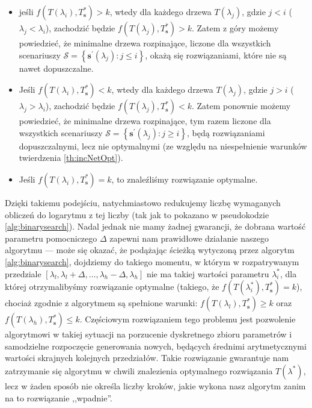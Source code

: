 \begin{itemize}
	\item jeśli $f \left( T \left( \lambda_{i} \right), T^{\ast}_{\textbf{s}} \right) > k$, wtedy dla każdego drzewa $T \left( \lambda_{j} \right)$, gdzie $j < i$ ($\lambda_{j} < \lambda_{i}$), zachodzić będzie $f \left( T \left( \lambda_{j} \right), T^{\ast}_{\textbf{s}} \right) > k$. Zatem z góry możemy powiedzieć, że minimalne drzewa rozpinające, liczone dla wszystkich scenariuszy $\mathcal{S} = \left\{ \textbf{s}^{\prime} \left( \lambda_{j} \right) : j \leqslant i \right\}$, okażą się rozwiązaniami, które nie są nawet dopuszczalne.
	\item Jeśli $f \left( T \left( \lambda_{i} \right), T^{\ast}_{\textbf{s}} \right) < k$, wtedy dla każdego drzewa $T \left( \lambda_{j} \right)$, gdzie $j > i$ ($\lambda_{j} > \lambda_{i}$), zachodzić będzie $f \left( T \left( \lambda_{j} \right), T^{\ast}_{\textbf{s}} \right) < k$. Zatem ponownie możemy powiedzieć, że minimalne drzewa rozpinające, tym razem liczone dla wszystkich scenariuszy $\mathcal{S} = \left\{ \textbf{s}^{\prime} \left( \lambda_{j} \right) : j \geqslant i \right\}$, będą rozwiązaniami dopuszczalnymi, lecz nie optymalnymi (ze względu na niespełnienie warunków twierdzenia \ref{th:incNetOpt}).
	\item Jeśli $f \left( T \left( \lambda_{i} \right), T^{\ast}_{\textbf{s}} \right) = k$, to znaleźliśmy rozwiązanie optymalne.
\end{itemize}

Dzięki takiemu podejściu, natychmiastowo redukujemy liczbę wymaganych obliczeń do logarytmu z tej liczby (tak jak to pokazano w pseudokodzie \ref{alg:binarysearch}). Nadal jednak nie mamy żadnej gwarancji, że dobrana wartość parametru pomocniczego $\Delta$ zapewni nam prawidłowe działanie naszego algorytmu --- może się okazać, że podążając ścieżką wytyczoną przez algorytm \ref{alg:binarysearch}, dojdziemy do takiego momentu, w którym w rozpatrywanym przedziale $\left[ \lambda_{l}, \lambda_{l} + \Delta, \dots, \lambda_{h} - \Delta, \lambda_{h} \right]$ nie ma takiej wartości parametru $\lambda^{\ast}_{i}$, dla której otrzymalibyśmy rozwiązanie optymalne (takiego, że $f \left( T \left( \lambda^{\ast}_{i} \right), T^{\ast}_{\textbf{s}} \right) = k$), chociaż zgodnie z algorytmem są spełnione warunki: $f \left( T \left( \lambda_{l} \right), T^{\ast}_{\textbf{s}} \right) \geqslant k$ oraz $f \left( T \left( \lambda_{h} \right), T^{\ast}_{\textbf{s}} \right) \leqslant k$. Częściowym rozwiązaniem tego problemu jest pozwolenie algorytmowi w takiej sytuacji na porzucenie dyskretnego zbioru parametrów i samodzielne rozpoczęcie generowania nowych, będących średnimi arytmetycznymi wartości skrajnych kolejnych przedziałów. Takie rozwiązanie gwarantuje nam zatrzymanie się algorytmu w chwili znalezienia optymalnego rozwiązania $T \left( \lambda^{\ast} \right)$, lecz w żaden sposób nie określa liczby kroków, jakie wykona nasz algorytm zanim na to rozwiązanie ,,wpadnie''.


